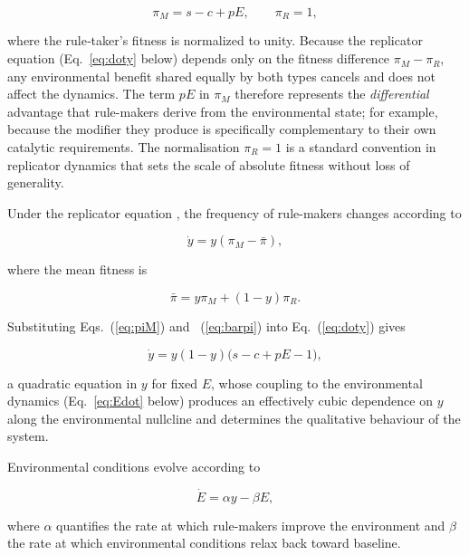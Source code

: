 \documentclass[11pt]{article}
\newcommand{\rev}[1]{#1}
\begin{document}
\begin{equation}
\pi_M = s - c + pE, \qquad \pi_R = 1,
\label{eq:piM}
\end{equation}

where the rule‑taker’s fitness is normalized to unity. \rev{Because the replicator equation (Eq.~\ref{eq:doty} below) depends only on the fitness difference $\pi_M - \pi_R$, any environmental benefit shared equally by both types cancels and does not affect the dynamics. The term $pE$ in $\pi_M$ therefore represents the \emph{differential} advantage that rule-makers derive from the environmental state; for example, because the modifier they produce is specifically complementary to their own catalytic requirements. The normalisation $\pi_R = 1$ is a standard convention in replicator dynamics that sets the scale of absolute fitness without loss of generality.}

Under the replicator equation \rev{\citep{HofbauerSigmund1998,HofbauerSigmund2003}}, the frequency of rule-makers changes according to

\begin{equation}
\dot y = y(\pi_M - \bar\pi),
\label{eq:doty}
\end{equation}

where the mean fitness is

\begin{equation}
\bar\pi = y\pi_M + (1-y)\pi_R.
\label{eq:barpi}
\end{equation}

Substituting Eqs.~(\ref{eq:piM}) and ~(\ref{eq:barpi}) into Eq.~(\ref{eq:doty}) gives

\begin{equation}
\dot y = y(1-y)\bigl(s - c + pE - 1\bigr),
\label{eq:ydot}
\end{equation}

\rev{a quadratic equation in $y$ for fixed $E$, whose coupling to the environmental dynamics (Eq.~\ref{eq:Edot} below) produces an effectively cubic dependence on $y$ along the environmental nullcline and determines the qualitative behaviour of the system.}

Environmental conditions evolve according to

\begin{equation}
\dot E = \alpha y - \beta E,
\label{eq:Edot}
\end{equation}

where $\alpha$ quantifies the rate at which rule-makers improve the environment and $\beta$ the rate at which environmental conditions relax back toward baseline. 
\end{document}
